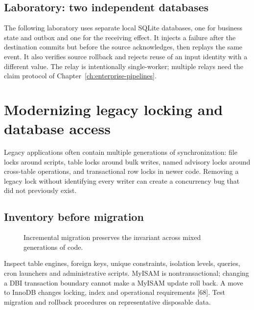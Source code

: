 \section{Laboratory: two independent databases}
The following laboratory uses separate local SQLite databases, one for
business state and outbox and one for the receiving effect. It injects a
failure after the destination commits but before the source acknowledges,
then replays the same event. It also verifies source rollback and rejects
reuse of an input identity with a different value. The relay is intentionally
single-worker; multiple relays need the claim protocol of
Chapter~\ref{ch:enterprise-pipelines}.

\chapter{Modernizing legacy locking and database access}
\label{ch:enterprise-migration}
Legacy applications often contain multiple generations of synchronization:
file locks around scripts, table locks around bulk writes, named advisory
locks around cross-table operations, and transactional row locks in newer
code. Removing a legacy lock without identifying every writer can create
a concurrency bug that did not previously exist.

\section{Inventory before migration}
\begin{figure}[!htbp]\centering
{}
\caption{Incremental migration preserves the invariant across mixed generations of code.}
\end{figure}
Inspect table engines, foreign keys, unique constraints, isolation levels,
queries, cron launchers and administrative scripts. MyISAM is nontransactional;
changing a DBI transaction boundary cannot make a MyISAM update roll back.
A move to InnoDB changes locking, index and operational requirements [68].
Test migration and rollback procedures on representative disposable data.

